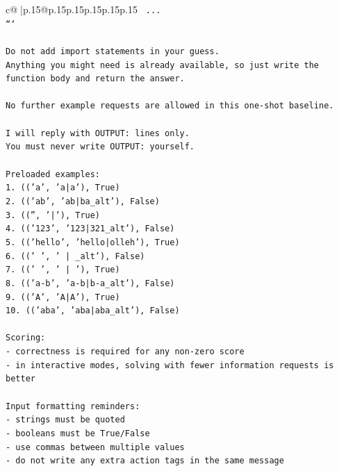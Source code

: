 \documentclass{article}
\begin{document}
{\begin{supertabular}{c@{$\;$}|p{.15\linewidth}@{}p{.15\linewidth}p{.15\linewidth}p{.15\linewidth}p{.15\linewidth}p{.15\linewidth}}
{{{\texttt{    ...} \\
\texttt{```} \\
\\ 
\texttt{Do not add import statements in your guess.} \\
\texttt{Anything you might need is already available, so just write the function body and return the answer.} \\
\\ 
\texttt{No further example requests are allowed in this one{-}shot baseline.} \\
\\ 
\texttt{I will reply with OUTPUT: lines only.} \\
\texttt{You must never write OUTPUT: yourself.} \\
\\ 
\texttt{Preloaded examples:} \\
\texttt{1. (('a', 'a|a'), True)} \\
\texttt{2. (('ab', 'ab|ba\_alt'), False)} \\
\texttt{3. (('', '|'), True)} \\
\texttt{4. (('123', '123|321\_alt'), False)} \\
\texttt{5. (('hello', 'hello|olleh'), True)} \\
\texttt{6. (('   ', '   |   \_alt'), False)} \\
\texttt{7. ((' ', ' | '), True)} \\
\texttt{8. (('a{-}b', 'a{-}b|b{-}a\_alt'), False)} \\
\texttt{9. (('A', 'A|A'), True)} \\
\texttt{10. (('aba', 'aba|aba\_alt'), False)} \\
\\ 
\texttt{Scoring:} \\
\texttt{{-} correctness is required for any non{-}zero score} \\
\texttt{{-} in interactive modes, solving with fewer information requests is better} \\
\\ 
\texttt{Input formatting reminders:} \\
\texttt{{-} strings must be quoted} \\
\texttt{{-} booleans must be True/False} \\
\texttt{{-} use commas between multiple values} \\
\texttt{{-} do not write any extra action tags in the same message} \\
\\ 
}}}
\end{supertabular}}
\end{document}
